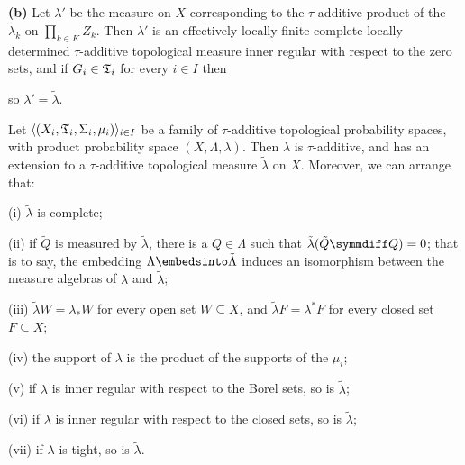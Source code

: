 {\medskip

{\bf (b)} Let $\lambda'$ be the measure on $X$ corresponding to the
$\tau$-additive product of the $\tilde\lambda_k$ on $\prod_{k\in K}Z_k$.
Then $\lambda'$ is an effectively locally finite complete locally
determined $\tau$-additive topological measure inner regular with
respect to the zero sets, and if $G_i\in\frak T_i$ for every $i\in I$
then


\noindent so $\lambda'=\tilde\lambda$.
}%

 Let
$\langle(X_i,\frak T_i,\Sigma_i,\mu_i)\rangle_{i\in I}$
be a family of $\tau$-additive topological probability spaces, with
product probability space $(X,\Lambda,\lambda)$.   Then $\lambda$ is
$\tau$-additive, and has an extension to a $\tau$-additive topological
measure $\tilde\lambda$ on $X$.   Moreover, we can arrange that:

(i) $\tilde\lambda$ is complete;

(ii) if $\tilde Q$ is measured by $\tilde\lambda$, there is a
$Q\in\Lambda$ such that $\tilde\lambda(\tilde Q\symmdiff Q)=0$;  that is to
say, the embedding $\Lambda\embedsinto\tilde\Lambda$ induces an
isomorphism between the measure algebras of $\lambda$ and
$\tilde\lambda$;

(iii) $\tilde\lambda W=\lambda_*W$ for every open set $W\subseteq X$,
and $\tilde\lambda F=\lambda^*F$ for every closed set $F\subseteq X$;

(iv) the support of $\lambda$ is the product of the supports of the
$\mu_i$;

(v) if $\lambda$ is inner regular with respect to the Borel sets, so is
$\tilde\lambda$;

(vi) if $\lambda$ is inner regular with respect to the closed sets, so
is $\tilde\lambda$;

(vii) if $\lambda$ is tight, so is $\tilde\lambda$.

